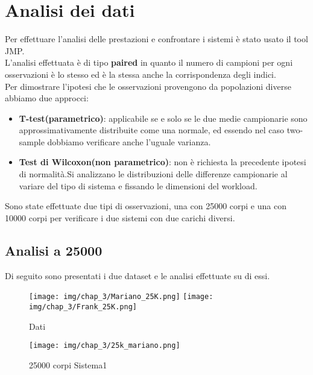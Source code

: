 \section{Analisi dei dati}
Per effettuare l'analisi delle prestazioni e confrontare i sistemi è stato usato il tool JMP.\\
L'analisi effettuata è di tipo \textbf{paired} in quanto il numero di campioni per ogni osservazioni è lo stesso ed è la stessa anche la corrispondenza degli indici.\\
Per dimostrare l'ipotesi che le osservazioni provengono da popolazioni diverse abbiamo due approcci:

\begin{itemize}
    \item \textbf{T-test(parametrico)}: applicabile se e solo se le due medie campionarie sono approssimativamente distribuite come una normale, ed essendo nel caso two-sample dobbiamo verificare anche l'uguale varianza.
    \item \textbf{Test di Wilcoxon(non parametrico)}: non è richiesta la precedente ipotesi di normalità.Si analizzano le distribuzioni delle differenze campionarie al variare del tipo di sistema e fissando le dimensioni del workload.
\end{itemize}
Sono state effettuate due tipi di osservazioni, una con 25000 corpi e una con 10000 corpi per verificare i due sistemi con due carichi diversi.\\
\subsection{Analisi a 25000}
Di seguito sono presentati i due dataset e le analisi effettuate su di essi.\\
\begin{figure}[H]
    \centering
    \texttt{[image: img/chap\_3/Mariano\_25K.png]}
    \texttt{[image: img/chap\_3/Frank\_25K.png]}
    \caption{Dati}
    \label{fig:data}
\end{figure}

\begin{figure}[H]
    \centering
    \texttt{[image: img/chap\_3/25k\_mariano.png]}
    \caption{25000 corpi Sistema1}
    \label{fig:sis_1_25_k}
\end{figure}

